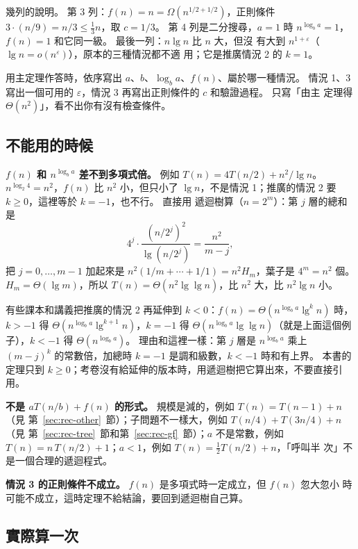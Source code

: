 幾列的說明。 第 3 列：$f(n) = n = \Omega(n^{1/2 + 1/2})$，正則條件
$3 \cdot (n/9) = n/3 \le \frac{1}{3} n$，取 $c = 1/3$。 第 4 列是二分搜尋，$a = 1$
時 $n^{\log_b a} = 1$，$f(n) = 1$ 和它同一級。 最後一列：$n \lg n$ 比 $n$ 大，但沒
有大到 $n^{1+\varepsilon}$（$\lg n = o(n^{\varepsilon})$），原本的三種情況都不適
用；它是推廣情況 2 的 $k = 1$。

\begin{examnote}
用主定理作答時，依序寫出 $a$、$b$、$\log_b a$、$f(n)$、屬於哪一種情況。 情況 1、3
寫出一個可用的 $\varepsilon$，情況 3 再寫出正則條件的 $c$ 和驗證過程。 只寫「由主
定理得 $\Theta(n^2)$」，看不出你有沒有檢查條件。
\end{examnote}

\subsection{不能用的時候}

\textbf{$f(n)$ 和 $n^{\log_b a}$ 差不到多項式倍。} 例如
$T(n) = 4T(n/2) + n^2 / \lg n$。 $n^{\log_2 4} = n^2$，$f(n)$ 比 $n^2$ 小，但只小了
$\lg n$，不是情況 1；推廣的情況 2 要 $k \ge 0$，這裡等於 $k = -1$，也不行。 直接用
遞迴樹算（$n = 2^m$）：第 $j$ 層的總和是
\[
4^j \cdot \frac{(n/2^j)^2}{\lg (n/2^j)} = \frac{n^2}{m - j},
\]
把 $j = 0, \ldots, m - 1$ 加起來是 $n^2 (1/m + \cdots + 1/1) = n^2 H_m$，葉子是
$4^m = n^2$ 個。 $H_m = \Theta(\lg m)$，所以
$T(n) = \Theta(n^2 \lg \lg n)$，比 $n^2$ 大，比 $n^2 \lg n$ 小。

有些課本和講義把推廣的情況 2 再延伸到 $k < 0$：$f(n) = \Theta(n^{\log_b a} \lg^k n)$
時，$k > -1$ 得 $\Theta(n^{\log_b a} \lg^{k+1} n)$，$k = -1$ 得
$\Theta(n^{\log_b a} \lg \lg n)$（就是上面這個例子），$k < -1$ 得
$\Theta(n^{\log_b a})$。 理由和這裡一樣：第 $j$ 層是 $n^{\log_b a}$ 乘上
$(m - j)^k$ 的常數倍，加總時 $k = -1$ 是調和級數，$k < -1$ 時和有上界。 本書的
定理只到 $k \ge 0$；考卷沒有給延伸的版本時，用遞迴樹把它算出來，不要直接引用。

\textbf{不是 $aT(n/b) + f(n)$ 的形式。} 規模是減的，例如 $T(n) = T(n-1) + n$（見
第~\ref{sec:rec-other}~節）；子問題不一樣大，例如 $T(n/4) + T(3n/4) + n$（見
第~\ref{sec:rec-tree}~節和第~\ref{sec:rec-gf}~節）；$a$ 不是常數，例如
$T(n) = n\,T(n/2) + 1$；$a < 1$，例如 $T(n) = \frac{1}{2} T(n/2) + n$，「呼叫半
次」不是一個合理的遞迴程式。

\textbf{情況 3 的正則條件不成立。} $f(n)$ 是多項式時一定成立，但 $f(n)$ 忽大忽小
時可能不成立，這時定理不給結論，要回到遞迴樹自己算。

\subsection{實際算一次}

